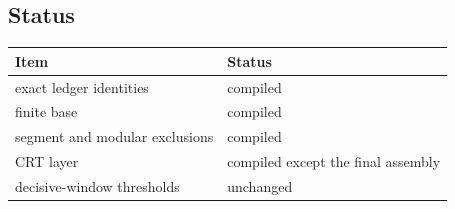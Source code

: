 \subsection{Status}

\begin{center}
\small
\begin{tabular}{@{}p{}p{}@{}}
\toprule
Item & Status \\
\midrule
exact ledger identities & compiled \\
finite base & compiled \\
segment and modular exclusions & compiled \\
CRT layer & compiled except the final assembly \\
decisive-window thresholds & unchanged \\
\bottomrule
\end{tabular}
\end{center}
